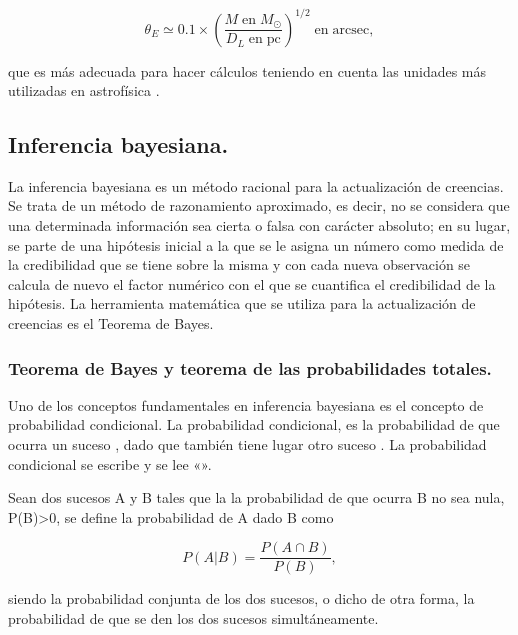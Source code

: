 \begin{equation}\label{eq:radio_einstein_magnitud}
    {\theta}_{E} \simeq 0.1 \times { {\left( \frac{M\;\mathrm{en}\;M_{\odot}}{D_L \;\mathrm{en\;pc}}\right)} }^{1/2}\;\mathrm{en\;arcsec},
\end{equation}

que es más adecuada para hacer cálculos teniendo en cuenta las unidades más utilizadas en astrofísica \citep{book:encyclopedia}.

\newpage

\subsection{Inferencia bayesiana.}

La inferencia bayesiana es un método racional para la actualización de creencias. Se trata de un método de razonamiento aproximado, es decir, no se considera que una determinada información sea cierta o falsa con carácter absoluto; en su lugar, se parte de una hipótesis inicial a la que se le asigna un número como medida de la credibilidad que se tiene sobre la misma y con cada nueva observación se calcula de nuevo el factor numérico con el que se cuantifica el credibilidad de la hipótesis. La herramienta matemática que se utiliza para la actualización de creencias es el Teorema de Bayes.

\subsubsection{Teorema de Bayes y teorema de las probabilidades totales.}

Uno de los conceptos fundamentales en inferencia bayesiana es el concepto de probabilidad condicional. La probabilidad condicional, es la probabilidad de que ocurra un suceso , dado que también tiene lugar otro suceso . La probabilidad condicional se escribe  y se lee «».

\begin{definition}
Sean dos sucesos A y B tales que la la probabilidad de que ocurra B no sea nula, P(B)>0, se define la probabilidad de A dado B como

\begin{equation}\label{eq:prob_condicional}
    P(A|B)=\frac{P(A \cap B)}{P(B)},
\end{equation}

siendo  la probabilidad conjunta de los dos sucesos, o dicho de otra forma, la probabilidad de que se den los dos sucesos simultáneamente.

\end{definition}

